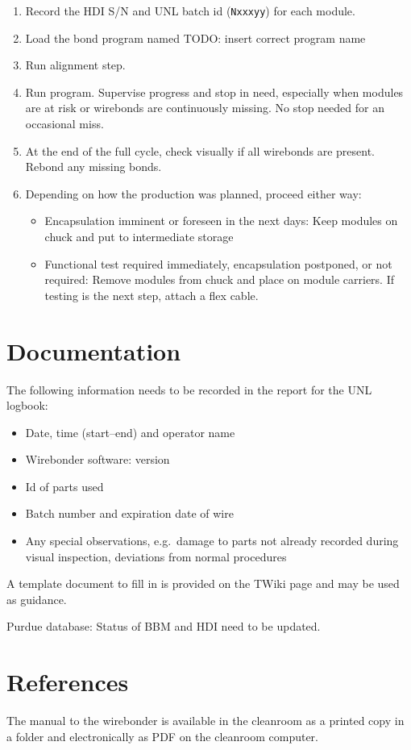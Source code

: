 \documentclass[12pt]{unlsilabsop}
\begin{document}
\begin{enumerate}
    \item Record the HDI S/N and UNL batch id (\texttt{Nxxxyy}) for each module.
    \item Load the bond program named TODO: insert correct program name
    \item Run alignment step.
    \item Run program. Supervise progress and stop in need, especially when modules are at risk or wirebonds are continuously missing. No stop needed for an occasional miss.
    \item At the end of the full cycle, check visually if all wirebonds are present. Rebond any missing bonds.
    \item Depending on how the production was planned, proceed either way:
    \begin{itemize}
	\item Encapsulation imminent or foreseen in the next days: Keep modules on chuck and put to intermediate storage
	\item Functional test required immediately, encapsulation postponed, or not required: Remove modules from chuck and place on module carriers. If testing is the next step, attach a flex cable.
    \end{itemize}
\end{enumerate}

\section{Documentation}
The following information needs to be recorded in the report for the UNL logbook:
\begin{itemize}
    \item Date, time (start--end) and operator name
    \item Wirebonder software: version
    \item Id of parts used
    \item Batch number and expiration date of wire
    \item Any special observations, e.g.~damage to parts not already recorded during visual inspection, deviations from normal procedures
\end{itemize}
A template document to fill in is provided on the TWiki page and may be used as guidance.

Purdue database: Status of BBM and HDI need to be updated.

\section{References}

The manual to the wirebonder is available in the cleanroom as a printed copy in a folder and electronically as PDF on the cleanroom computer.
\end{document}
